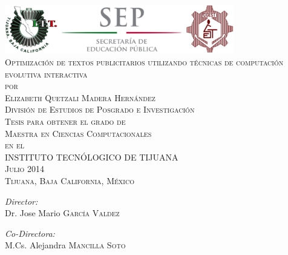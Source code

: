 \begin{titlepage}
  \begin{center}
    \includegraphics[width=0.75\textwidth]{./logos.png}~\\[1cm]
    \textsc{\LARGE Optimización de textos publicitarios utilizando técnicas de computación evolutiva interactiva}~\\[0.5cm]
\textsc{por}~\\[0.5cm]
\textsc{\Large Elizabeth Quetzali Madera Hernández}~\\[2.0cm]

\textsc{\Large División de Estudios de Posgrado e Investigación}~\\[0.5cm]
\textsc{Tesis para obtener el grado de}~\\[0.5cm]
\textsc{\Large Maestra en Ciencias Computacionales}~\\[0.5cm]
\textsc{en el}~\\[0.5cm]
\textsc{\Large INSTITUTO TECNÓLOGICO DE TIJUANA}~\\[1cm]
\textsc{Julio 2014}~\\[0.2cm]
\textsc{Tijuana, Baja California, México}~\\[1cm]

\begin{minipage}{1.5\textwidth}
  \begin{flushleft} \large
    \emph{Director:}\\
    Dr. Jose Mario \textsc{García Valdez}
  \end{flushleft}
\end{minipage}

\begin{minipage}{1.5\textwidth}
\begin{flushleft} \large
\emph{Co-Directora:} \\
M.Cs. Alejandra \textsc{Mancilla Soto}
\end{flushleft}
\end{minipage}

\vfill

  \end{center}

\end{titlepage}


